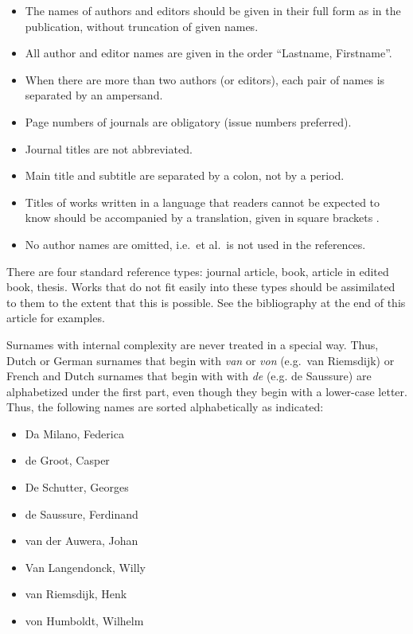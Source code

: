 \documentclass[cm,linguex]{glossa}
\begin{document}
\begin{itemize}
\item
  The names of authors and editors should be given in their full form as
  in the publication, without truncation of given names.
\item
  All author and editor names are given in the order ``Lastname,
  Firstname''.
\item
  When there are more than two authors (or editors), each pair of names
  is separated by an ampersand.
\item
  Page numbers of journals are obligatory (issue numbers preferred).
\item
  Journal titles are not abbreviated.
\item
  Main title and subtitle are separated by a colon, not by a period.
\item
  Titles of works written in a language that readers cannot be expected
  to know should be accompanied by a translation, given in square
  brackets \citep{Li1999}.
\item
  No author names are omitted, i.e.~et al.~is not used in the
  references.
\end{itemize}

There are four standard reference types: journal article, book, article
in edited book, thesis. Works that do not fit easily into these types
should be assimilated to them to the extent that this is possible. See
the bibliography at the end of this article for examples.

Surnames with internal complexity are never treated in a special way.
Thus, Dutch or German surnames that begin with \emph{van} or \emph{von}
(e.g.~van Riemsdijk) or French and Dutch surnames that begin with with
\emph{de} (e.g. de Saussure) are alphabetized under the first part, even
though they begin with a lower-case letter. Thus, the following names
are sorted alphabetically as indicated:

\begin{itemize}
\item
  Da Milano, Federica
\item
  de Groot, Casper
\item
  De Schutter, Georges
\item
  de Saussure, Ferdinand
\item
  van der Auwera, Johan
\item
  Van Langendonck, Willy
\item
  van Riemsdijk, Henk
\item
  von Humboldt, Wilhelm
\end{itemize}
\end{document}
